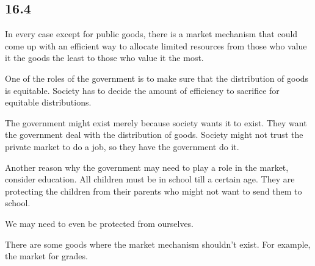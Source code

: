 \subsection*{16.4}
In every case except for public goods, there is a market mechanism that could come up with an efficient
way to allocate limited resources from those who value it the goods the least to those who value it the most.
\par
One of the roles of the government is to make sure that the distribution of goods is equitable.
Society has to decide the amount of efficiency to sacrifice for equitable distributions.
\par
The government might exist merely because society wants it to exist. They want the government deal with the distribution of goods.
Society might not trust the private market to do a job, so they have the government do it.
\par
Another reason why the government may need to play a role in the market, consider education. All children must be in school till a certain age.
They are protecting the children from their parents who might not want to send them to school.
\par 
We may need to even be protected from ourselves.
\par
There are some goods where the market mechanism shouldn't exist. For example, the market for grades.